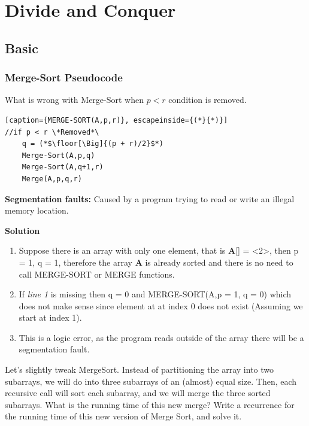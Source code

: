\documentclass[11pt,fleqn]{book}
\DeclarePairedDelimiter{\floor}{\lfloor}{\rfloor}
\begin{document}
\chapter{Divide and Conquer}
\section{Basic}
\vspace{1em}
\subsection{Merge-Sort Pseudocode} 
\begin{example}
What is wrong with Merge-Sort when $p < r$ condition is removed. 
\begin{lstlisting}[caption={MERGE-SORT(A,p,r)}, escapeinside={(*}{*)}]
//if p < r \*Removed*\
    q = (*$\floor[\Big]{(p + r)/2}$*)
    Merge-Sort(A,p,q)
    Merge-Sort(A,q+1,r)
    Merge(A,p,q,r)
\end{lstlisting}
\end{example}
\begin{definition}
\textbf{Segmentation faults:}  Caused by a program trying to read or write an illegal memory location.
\end{definition}
\textbf{Solution}\\
\begin{enumerate}
    \item Suppose there is an array with only one element, that is \textbf{A}[] = <2>, then p = 1, q = 1, therefore the array \textbf{A} is already sorted and there is no need to call MERGE-SORT or MERGE functions. 
    \item  If \textit{line 1} is missing then q = 0 and MERGE-SORT(A,p = 1, q = 0) which does not make sense since element at at index 0 does not exist (Assuming we start at index 1). 
    \item This is a logic error, as the program reads outside of the array there will be a segmentation fault.  
\end{enumerate}
\begin{example}
Let's slightly tweak MergeSort. Instead of partitioning  the  array  into two subarrays, we will do into three subarrays of an (almost) equal size.
    Then, each recursive call will sort each subarray,  and we will merge the three sorted subarrays.
    What is the running time of this new merge?  Write a recurrence for the running time of this new version of Merge Sort, and solve it. 
\end{example}
\end{document}
